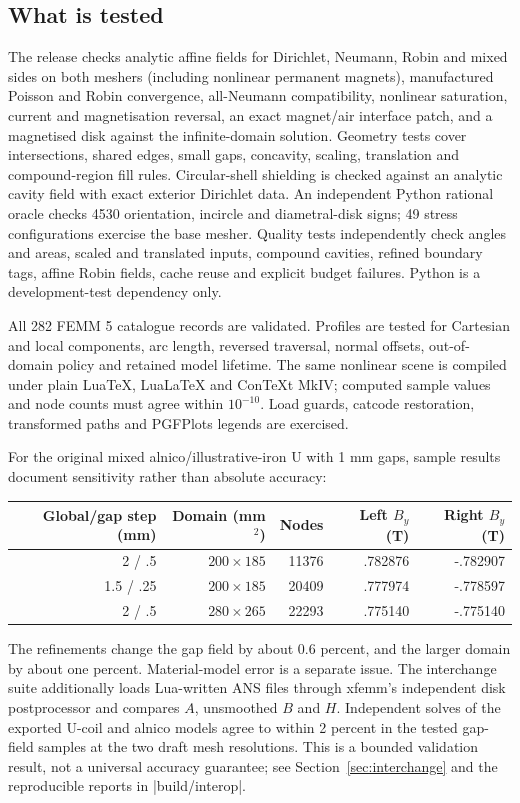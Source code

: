 \subsection{What is tested}
The release checks analytic affine fields for Dirichlet, Neumann, Robin
and mixed sides on both meshers (including nonlinear permanent magnets),
manufactured Poisson and Robin convergence, all-Neumann compatibility,
nonlinear saturation, current and magnetisation reversal, an exact
magnet/air interface patch, and a magnetised disk against the infinite-domain
solution. Geometry tests cover intersections, shared edges, small gaps,
concavity, scaling, translation and compound-region fill rules. Circular-shell
shielding is checked against an analytic cavity field with exact exterior
Dirichlet data. An independent Python rational oracle
checks 4530 orientation, incircle and diametral-disk signs; 49 stress
configurations exercise the base mesher. Quality tests independently check
angles and areas, scaled and translated inputs, compound cavities, refined
boundary tags, affine Robin fields, cache reuse and explicit budget failures.
Python is a development-test dependency only.

All 282 FEMM 5 catalogue records are validated. Profiles are tested for Cartesian
and local components, arc length, reversed traversal, normal offsets,
out-of-domain policy and retained model lifetime. The same nonlinear
scene is compiled under plain LuaTeX, LuaLaTeX and ConTeXt MkIV; computed
sample values and node counts must agree within $10^{-10}$. Load guards,
catcode restoration, transformed paths and PGFPlots legends are exercised.

For the original mixed alnico/illustrative-iron U with 1 mm gaps, sample
results document sensitivity rather than absolute accuracy:
\begin{center}\small
\begin{tabular}{rrrrr}
\toprule Global/gap step (mm) & Domain (mm$^2$) & Nodes & Left $B_y$ (T) & Right $B_y$ (T)\\
\midrule
2 / .5 & $200\times185$ & 11376 & .782876 & -.782907\\
1.5 / .25 & $200\times185$ & 20409 & .777974 & -.778597\\
2 / .5 & $280\times265$ & 22293 & .775140 & -.775140\\
\bottomrule
\end{tabular}\end{center}
The refinements change the gap field by about 0.6 percent, and the larger
domain by about one percent. Material-model error is a separate issue.
The interchange suite additionally loads Lua-written ANS files through xfemm's
independent disk postprocessor and compares $A$, unsmoothed $B$ and $H$.
Independent solves of the exported U-coil and alnico models agree to within
2 percent in the tested gap-field samples at the two draft mesh resolutions.
This is a bounded validation result, not a universal accuracy guarantee;
see Section~\ref{sec:interchange} and the reproducible reports in |build/interop|.


